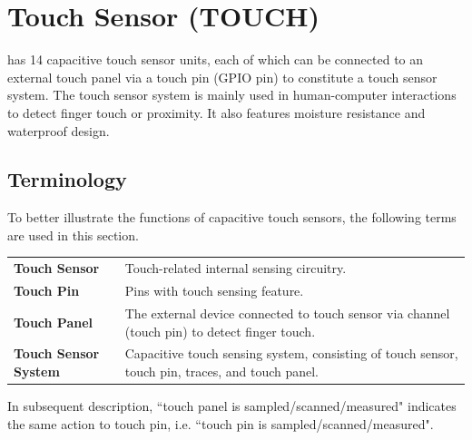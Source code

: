 \documentclass[main\_\_EN.tex]{subfiles}
\begin{document}

\ifglobal
\else
    {\let\clearpage\relax \listoftodos}
    {\let\clearpage\relax \listofdonetodos}
    \tableofcontents
\fi



\hypertarget{tchsen}{}
\chapter{Touch Sensor (TOUCH)}
\label{mod:tchsen}

\chipname{} has 14 capacitive touch sensor units, each of which can be connected to an external touch panel via a touch pin (GPIO pin) to constitute a touch sensor system. The \chipname{} touch sensor system is mainly used in human-computer interactions to detect finger touch or proximity. It also features moisture resistance and waterproof design.

\section{Terminology}
\label{sec:tchsen-term}

To better illustrate the functions of capacitive touch sensors, the following terms are used in this section.

\begin{longtable}[c]{ R{7cm} p{9cm} }
\textbf{Touch Sensor}  & Touch-related internal sensing circuitry. \\
\textbf{Touch Pin}    & Pins with touch sensing feature. \\ 
\textbf{Touch Panel}  & The external device connected to touch sensor via channel (touch pin) to detect finger touch. \\
\textbf{Touch Sensor System}  & Capacitive touch sensing system, consisting of touch sensor, touch pin, traces, and touch panel. \\
\end{longtable}

\vspace{-1em}
\begin{tiplisting}
    In subsequent description, ``touch panel is sampled/scanned/measured" indicates the same action to touch pin, i.e. ``touch pin is sampled/scanned/measured".
\end{tiplisting}
\vspace{-2em}
\end{document}
